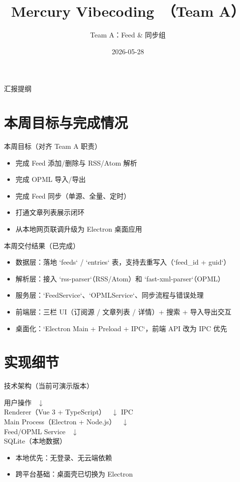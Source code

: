 \documentclass[aspectratio=169,11pt]{ctexbeamer}
\title{Mercury Vibecoding\ \n第二周进展汇报（Team A）}
\author{Team A：Feed \& 同步组}
\institute{课程小组项目}
\date{2026-05-28}
\begin{document}
\begin{frame}
  \titlepage
\end{frame}

\begin{frame}{汇报提纲}
\tableofcontents
\end{frame}

\section{本周目标与完成情况}
\begin{frame}{本周目标（对齐 Team A 职责）}
\begin{itemize}
  \item 完成 Feed 添加/删除与 RSS/Atom 解析
  \item 完成 OPML 导入/导出
  \item 完成 Feed 同步（单源、全量、定时）
  \item 打通文章列表展示闭环
  \item 从本地网页联调升级为 Electron 桌面应用
\end{itemize}
\end{frame}

\begin{frame}{本周交付结果（已完成）}
\begin{itemize}
  \item 数据层：落地 `feeds` / `entries` 表，支持去重写入（`feed_id + guid`）
  \item 解析层：接入 `rss-parser`（RSS/Atom）和 `fast-xml-parser`（OPML）
  \item 服务层：`FeedService`、`OPMLService`、同步流程与错误处理
  \item 前端层：三栏 UI（订阅源 / 文章列表 / 详情）+ 搜索 + 导入导出交互
  \item 桌面化：`Electron Main + Preload + IPC`，前端 API 改为 IPC 优先
\end{itemize}
\end{frame}

\section{实现细节}
\begin{frame}{技术架构（当前可演示版本）}
\begin{center}
\small
用户操作
\ $\downarrow$ \\
Renderer（Vue 3 + TypeScript）
\ $\downarrow$ IPC \\
Main Process（Electron + Node.js）
\ $\downarrow$ \\
Feed/OPML Service
\ $\downarrow$ \\
SQLite（本地数据）
\end{center}

\vspace{0.5em}
\begin{itemize}
  \item 本地优先：无登录、无云端依赖
  \item 跨平台基础：桌面壳已切换为 Electron
\end{itemize}
\end{frame}
\end{document}
